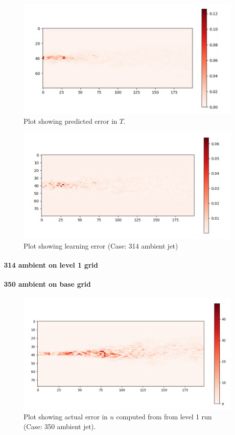 \documentclass{article}
\begin{document}
\begin{figure}[h!]
    \centering
    \includegraphics[width = 0.8\linewidth]{figures/314_01_grad_pred.png}
    \caption{Plot showing predicted error in $T$.}
    \label{amr_err}
\end{figure}

\begin{figure}[h!]
    \centering
    \includegraphics[width = 0.9\linewidth]{figures/314_01_grad_error.png}
    \caption{Plot showing learning error (Case: 314 ambient jet)}
    \label{amr_err}
\end{figure}

\paragraph{314 ambient on level 1 grid}

\paragraph{350 ambient on base grid}

\begin{figure}[h!]
    \centering
    \includegraphics[width = 0.8\linewidth]{figures/350_01_actual.png}
    \caption{Plot showing actual error in $u$ computed from from level 1 run (Case: 350 ambient jet).}
    \label{amr_err}
\end{figure}
\end{document}
